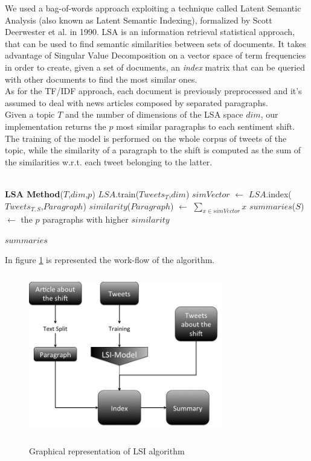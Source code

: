 We used a bag-of-words approach exploiting a technique called Latent Semantic Analysis (also known as Latent Semantic Indexing), formalized by Scott Deerwester et al. in 1990\cite{LSA}. LSA is an information retrieval statistical approach, that can be used to find semantic similarities between sets of documents. It takes advantage of Singular Value Decomposition on a vector space of term frequencies in order to create, given a set of documents, an \emph{index} matrix that can be queried with other documents to find the most similar ones.
\\
As for the TF/IDF approach, each document is previously preprocessed and it's assumed to deal with news articles composed by separated paragraphs.
\\
Given a topic $T$ and the number of dimensions of the LSA space $dim$, our implementation returns the $p$ most similar paragraphs to each sentiment shift. The training of the model is performed on the whole corpus of tweets of the topic, while the similarity of a paragraph to the shift is computed as the sum of the similarities w.r.t. each tweet belonging to the latter.
\\\\
\begin{algorithmic}
\STATE \textbf{LSA Method}($T$,$dim$,$p$)
\STATE
\STATE $LSA$.train($Tweets_T$,$dim$)
\STATE
{}
			\STATE $simVector$ $\leftarrow$ $LSA$.index($Tweets_{T,S}$,$Paragraph$)
			\STATE $similarity$($Paragraph$) $\leftarrow$ $\sum_{x \in simVector} x $
		\ENDFOR
	\ENDFOR
	\STATE $summaries$($S$) $\leftarrow$ the $p$ paragraphs with higher $similarity$

\ENDFOR
\STATE
\RETURN $summaries$

In figure \ref{fig:LSI} is represented the work-flow of the algorithm. 

\begin{figure}[htbp]
	\centering
			{\includegraphics[width=8.5cm,height=7cm]{image/LSI.jpg}}	
		\caption[LSI]{Graphical representation of LSI algorithm}
	\label{fig:LSI}
\end{figure} 

\end{algorithmic}
